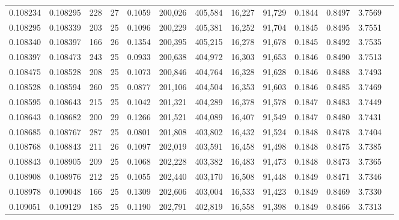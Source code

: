 \begin{tabular}{rrrrrrrrrrrrr}
0.108234 & 0.108295 & 228 &  27 &                                     0.1059 & 200,026 & 405,584 &  16,227 &  91,729 & 0.1844 & 0.8497 & 3.7569 \\
0.108295 & 0.108339 & 203 &  25 &                                     0.1096 & 200,229 & 405,381 &  16,252 &  91,704 & 0.1845 & 0.8495 & 3.7551 \\
0.108340 & 0.108397 & 166 &  26 &                                     0.1354 & 200,395 & 405,215 &  16,278 &  91,678 & 0.1845 & 0.8492 & 3.7535 \\
0.108397 & 0.108473 & 243 &  25 &                                     0.0933 & 200,638 & 404,972 &  16,303 &  91,653 & 0.1846 & 0.8490 & 3.7513 \\
0.108475 & 0.108528 & 208 &  25 &                                     0.1073 & 200,846 & 404,764 &  16,328 &  91,628 & 0.1846 & 0.8488 & 3.7493 \\
0.108528 & 0.108594 & 260 &  25 &                                     0.0877 & 201,106 & 404,504 &  16,353 &  91,603 & 0.1846 & 0.8485 & 3.7469 \\
0.108595 & 0.108643 & 215 &  25 &                                     0.1042 & 201,321 & 404,289 &  16,378 &  91,578 & 0.1847 & 0.8483 & 3.7449 \\
0.108643 & 0.108682 & 200 &  29 &                                     0.1266 & 201,521 & 404,089 &  16,407 &  91,549 & 0.1847 & 0.8480 & 3.7431 \\
0.108685 & 0.108767 & 287 &  25 &                                     0.0801 & 201,808 & 403,802 &  16,432 &  91,524 & 0.1848 & 0.8478 & 3.7404 \\
0.108768 & 0.108843 & 211 &  26 &                                     0.1097 & 202,019 & 403,591 &  16,458 &  91,498 & 0.1848 & 0.8475 & 3.7385 \\
0.108843 & 0.108905 & 209 &  25 &                                     0.1068 & 202,228 & 403,382 &  16,483 &  91,473 & 0.1848 & 0.8473 & 3.7365 \\
0.108908 & 0.108976 & 212 &  25 &                                     0.1055 & 202,440 & 403,170 &  16,508 &  91,448 & 0.1849 & 0.8471 & 3.7346 \\
0.108978 & 0.109048 & 166 &  25 &                                     0.1309 & 202,606 & 403,004 &  16,533 &  91,423 & 0.1849 & 0.8469 & 3.7330 \\
0.109051 & 0.109129 & 185 &  25 &                                     0.1190 & 202,791 & 402,819 &  16,558 &  91,398 & 0.1849 & 0.8466 & 3.7313 \\

\end{tabular}
